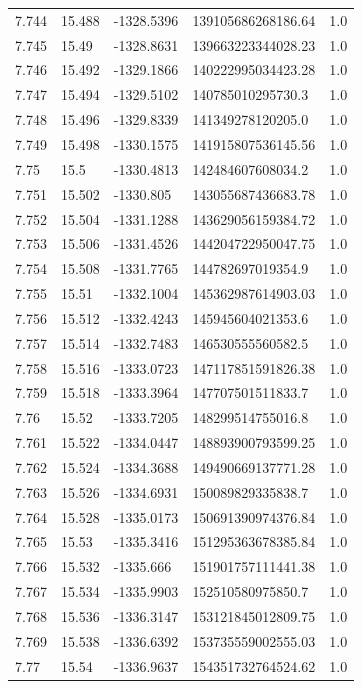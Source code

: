 \begin{tabular}{lllll}
7.744 & 15.488 & -1328.5396 & 139105686268186.64 & 1.0 \\
7.745 & 15.49 & -1328.8631 & 139663223344028.23 & 1.0 \\
7.746 & 15.492 & -1329.1866 & 140222995034423.28 & 1.0 \\
7.747 & 15.494 & -1329.5102 & 140785010295730.3 & 1.0 \\
7.748 & 15.496 & -1329.8339 & 141349278120205.0 & 1.0 \\
7.749 & 15.498 & -1330.1575 & 141915807536145.56 & 1.0 \\
7.75 & 15.5 & -1330.4813 & 142484607608034.2 & 1.0 \\
7.751 & 15.502 & -1330.805 & 143055687436683.78 & 1.0 \\
7.752 & 15.504 & -1331.1288 & 143629056159384.72 & 1.0 \\
7.753 & 15.506 & -1331.4526 & 144204722950047.75 & 1.0 \\
7.754 & 15.508 & -1331.7765 & 144782697019354.9 & 1.0 \\
7.755 & 15.51 & -1332.1004 & 145362987614903.03 & 1.0 \\
7.756 & 15.512 & -1332.4243 & 145945604021353.6 & 1.0 \\
7.757 & 15.514 & -1332.7483 & 146530555560582.5 & 1.0 \\
7.758 & 15.516 & -1333.0723 & 147117851591826.38 & 1.0 \\
7.759 & 15.518 & -1333.3964 & 147707501511833.7 & 1.0 \\
7.76 & 15.52 & -1333.7205 & 148299514755016.8 & 1.0 \\
7.761 & 15.522 & -1334.0447 & 148893900793599.25 & 1.0 \\
7.762 & 15.524 & -1334.3688 & 149490669137771.28 & 1.0 \\
7.763 & 15.526 & -1334.6931 & 150089829335838.7 & 1.0 \\
7.764 & 15.528 & -1335.0173 & 150691390974376.84 & 1.0 \\
7.765 & 15.53 & -1335.3416 & 151295363678385.84 & 1.0 \\
7.766 & 15.532 & -1335.666 & 151901757111441.38 & 1.0 \\
7.767 & 15.534 & -1335.9903 & 152510580975850.7 & 1.0 \\
7.768 & 15.536 & -1336.3147 & 153121845012809.75 & 1.0 \\
7.769 & 15.538 & -1336.6392 & 153735559002555.03 & 1.0 \\
7.77 & 15.54 & -1336.9637 & 154351732764524.62 & 1.0 \\

\end{tabular}
